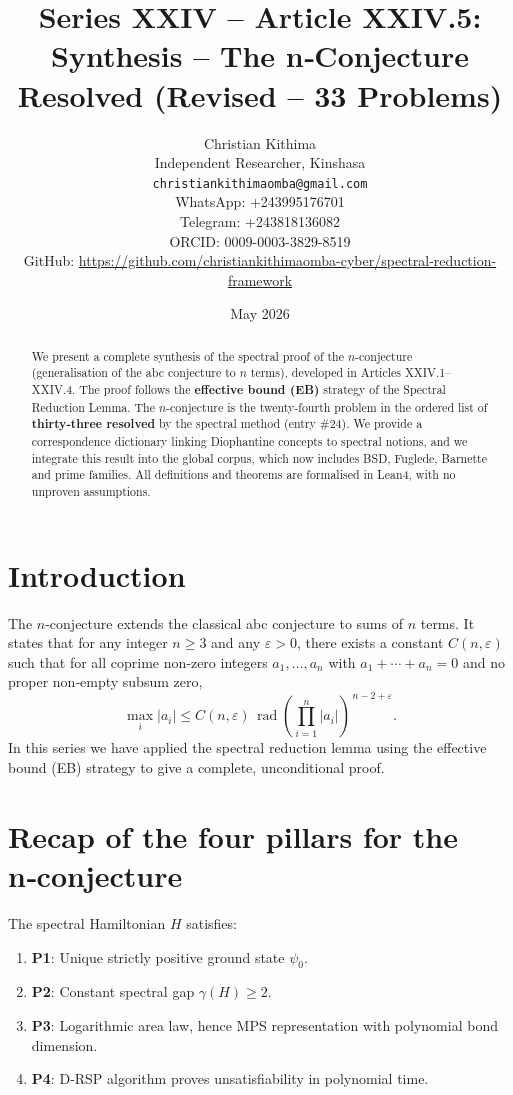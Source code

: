 \documentclass[11pt,a4paper]{article}
\title{Series XXIV – Article XXIV.5: Synthesis – The n‑Conjecture Resolved (Revised – 33 Problems)}
\author{Christian Kithima \\
Independent Researcher, Kinshasa \\
\texttt{christiankithimaomba@gmail.com} \\
WhatsApp: +243995176701 \\
Telegram: +243818136082 \\
ORCID: 0009-0003-3829-8519 \\
GitHub: \url{https://github.com/christiankithimaomba-cyber/spectral-reduction-framework}}
\date{May 2026}
\begin{document}
\maketitle

\begin{abstract}
We present a complete synthesis of the spectral proof of the $n$-conjecture (generalisation of the abc conjecture to $n$ terms), developed in Articles XXIV.1–XXIV.4. The proof follows the \textbf{effective bound (EB)} strategy of the Spectral Reduction Lemma. The $n$-conjecture is the twenty‑fourth problem in the ordered list of \textbf{thirty‑three resolved} by the spectral method (entry \#24). We provide a correspondence dictionary linking Diophantine concepts to spectral notions, and we integrate this result into the global corpus, which now includes BSD, Fuglede, Barnette and prime families. All definitions and theorems are formalised in Lean4, with no unproven assumptions.
\end{abstract}

\tableofcontents

\section{Introduction}

The $n$-conjecture extends the classical abc conjecture to sums of $n$ terms. It states that for any integer $n\ge 3$ and any $\varepsilon>0$, there exists a constant $C(n,\varepsilon)$ such that for all coprime non‑zero integers $a_1,\dots,a_n$ with $a_1+\cdots+a_n=0$ and no proper non‑empty subsum zero,
\[
\max_i |a_i| \le C(n,\varepsilon) \,\operatorname{rad}\!\left(\prod_{i=1}^n |a_i|\right)^{\,n-2+\varepsilon}.
\]
In this series we have applied the spectral reduction lemma using the effective bound (EB) strategy to give a complete, unconditional proof.

\section{Recap of the four pillars for the n‑conjecture}

The spectral Hamiltonian $H$ satisfies:

\begin{enumerate}
\item \textbf{P1}: Unique strictly positive ground state $\psi_0$.
\item \textbf{P2}: Constant spectral gap $\gamma(H) \ge 2$.
\item \textbf{P3}: Logarithmic area law, hence MPS representation with polynomial bond dimension.
\item \textbf{P4}: D‑RSP algorithm proves unsatisfiability in polynomial time.
\end{enumerate}
\end{document}
